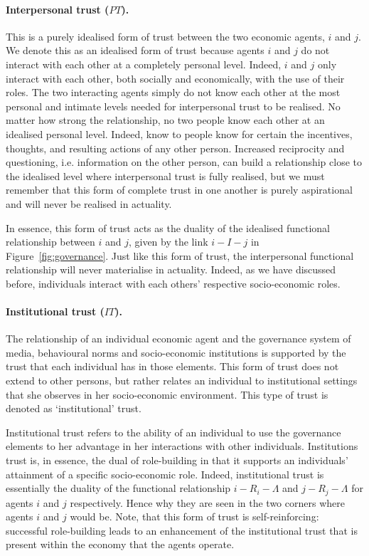 \begin{subappendices}
\paragraph{Interpersonal trust ($PT$).}

This is a purely idealised form of trust between the two economic agents, $i$ and $j$. We denote this as an idealised form of trust because agents $i$ and $j$ do not interact with each other at a completely personal level. Indeed, $i$ and $j$ only interact with each other, both socially and economically, with the use of their roles. The two interacting agents simply do not know each other at the most personal and intimate levels needed for interpersonal trust to be realised. No matter how strong the relationship, no two people know each other at an idealised personal level. Indeed, know to people know for certain the incentives, thoughts, and resulting actions of any other person. Increased reciprocity and questioning, i.e. information on the other person, can build a relationship close to the idealised level where interpersonal trust is fully realised, but we must remember that this form of complete trust in one another is purely aspirational and will never be realised in actuality.

In essence, this form of trust acts as the duality of the idealised functional relationship between $i$ and $j$, given by the link $i-I-j$ in Figure~\ref{fig:governance}. Just like this form of trust, the interpersonal functional relationship will never materialise in actuality. Indeed, as we have discussed before, individuals interact with each others' respective socio-economic roles.

\paragraph{Institutional trust ($IT$).}

The relationship of an individual economic agent and the governance system of media, behavioural norms and socio-economic institutions is supported by the trust that each individual has in those elements. This form of trust does not extend to other persons, but rather relates an individual to institutional settings that she observes in her socio-economic environment. This type of trust is denoted as `institutional' trust.

Institutional trust refers to the ability of an individual to use the governance elements to her advantage in her interactions with other individuals. Institutions trust is, in essence, the dual of role-building in that it supports an individuals' attainment of a specific socio-economic role. Indeed, institutional trust is essentially the duality of the functional relationship $i-R_{i}-\Lambda$ and $j-R_{j}-\Lambda$ for agents $i$ and $j$ respectively. Hence why they are seen in the two corners where agents $i$ and $j$ would be. Note, that this form of trust is self-reinforcing: successful role-building leads to an enhancement of the institutional trust that is present within the economy that the agents operate.


\end{subappendices}
